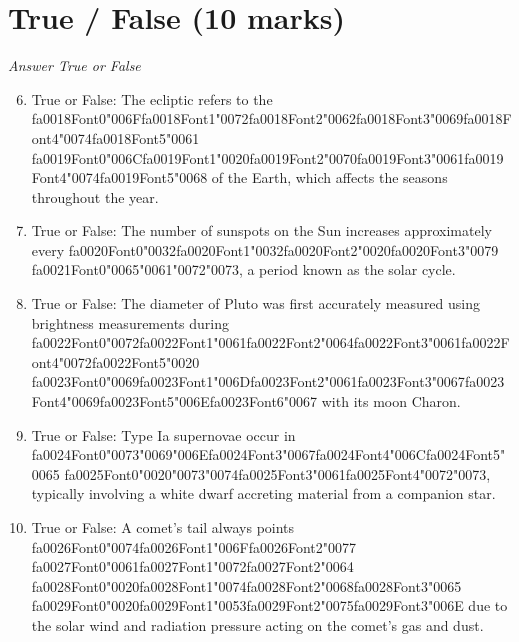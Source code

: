 \documentclass[12pt]{article}
\begin{document}
\section*{True / False (10 marks)}
\textit{Answer True or False}
\begin{enumerate}[label=\arabic*.]
\setcounter{enumi}{5}
\item True or False: The ecliptic refers to the {\csname fa0018Font0\endcsname\char"006F}{\csname fa0018Font1\endcsname\char"0072}{\csname fa0018Font2\endcsname\char"0062}{\csname fa0018Font3\endcsname\char"0069}{\csname fa0018Font4\endcsname\char"0074}{\csname fa0018Font5\endcsname\char"0061} {\csname fa0019Font0\endcsname\char"006C}{\csname fa0019Font1\endcsname\char"0020}{\csname fa0019Font2\endcsname\char"0070}{\csname fa0019Font3\endcsname\char"0061}{\csname fa0019Font4\endcsname\char"0074}{\csname fa0019Font5\endcsname\char"0068} of the Earth, which affects the seasons throughout the year.
\item True or False: The number of sunspots on the Sun increases approximately every {\csname fa0020Font0\endcsname\char"0032}{\csname fa0020Font1\endcsname\char"0032}{\csname fa0020Font2\endcsname\char"0020}{\csname fa0020Font3\endcsname\char"0079} {\csname fa0021Font0\endcsname\char"0065}{\char"0061}{\char"0072}{\char"0073}, a period known as the solar cycle.
\item True or False: The diameter of Pluto was first accurately measured using brightness measurements during {\csname fa0022Font0\endcsname\char"0072}{\csname fa0022Font1\endcsname\char"0061}{\csname fa0022Font2\endcsname\char"0064}{\csname fa0022Font3\endcsname\char"0061}{\csname fa0022Font4\endcsname\char"0072}{\csname fa0022Font5\endcsname\char"0020} {\csname fa0023Font0\endcsname\char"0069}{\csname fa0023Font1\endcsname\char"006D}{\csname fa0023Font2\endcsname\char"0061}{\csname fa0023Font3\endcsname\char"0067}{\csname fa0023Font4\endcsname\char"0069}{\csname fa0023Font5\endcsname\char"006E}{\csname fa0023Font6\endcsname\char"0067} with its moon Charon.
\item True or False: Type Ia supernovae occur in {\csname fa0024Font0\endcsname\char"0073}{\char"0069}{\char"006E}{\csname fa0024Font3\endcsname\char"0067}{\csname fa0024Font4\endcsname\char"006C}{\csname fa0024Font5\endcsname\char"0065} {\csname fa0025Font0\endcsname\char"0020}{\char"0073}{\char"0074}{\csname fa0025Font3\endcsname\char"0061}{\csname fa0025Font4\endcsname\char"0072}{\char"0073}, typically involving a white dwarf accreting material from a companion star.
\item True or False: A comet's tail always points {\csname fa0026Font0\endcsname\char"0074}{\csname fa0026Font1\endcsname\char"006F}{\csname fa0026Font2\endcsname\char"0077} {\csname fa0027Font0\endcsname\char"0061}{\csname fa0027Font1\endcsname\char"0072}{\csname fa0027Font2\endcsname\char"0064} {\csname fa0028Font0\endcsname\char"0020}{\csname fa0028Font1\endcsname\char"0074}{\csname fa0028Font2\endcsname\char"0068}{\csname fa0028Font3\endcsname\char"0065} {\csname fa0029Font0\endcsname\char"0020}{\csname fa0029Font1\endcsname\char"0053}{\csname fa0029Font2\endcsname\char"0075}{\csname fa0029Font3\endcsname\char"006E} due to the solar wind and radiation pressure acting on the comet's gas and dust.

\end{enumerate}
\end{document}

